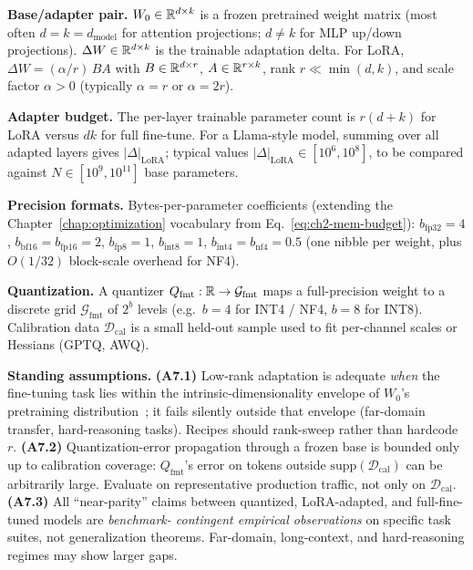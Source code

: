 \begin{notationbox}
\textbf{Base/adapter pair.}
$W_0 \in \mathbb{R}^{d \times k}$ is a frozen pretrained weight matrix (most
often $d = k = d_{\mathrm{model}}$ for attention projections; $d \ne
k$ for MLP up/down projections). $\Delta W \in \mathbb{R}^{d \times k}$ is
the trainable adaptation delta. For LoRA,
$\Delta W = (\alpha/r)\,B A$ with $B \in \mathbb{R}^{d \times r}$,
$A \in \mathbb{R}^{r \times k}$, rank $r \ll \min(d,k)$, and scale factor
$\alpha > 0$ (typically $\alpha = r$ or $\alpha = 2r$).

\textbf{Adapter budget.}
The per-layer trainable parameter count is $r(d+k)$ for LoRA versus
$dk$ for full fine-tune. For a Llama-style model, summing over all
adapted layers gives $|\Delta|_{\mathrm{LoRA}}$; typical values
$|\Delta|_{\mathrm{LoRA}} \in [10^{6}, 10^{8}]$, to be compared
against $N \in [10^{9}, 10^{11}]$ base parameters.

\textbf{Precision formats.}
Bytes-per-parameter coefficients (extending the Chapter~\ref{chap:optimization} vocabulary
from Eq.~\eqref{eq:ch2-mem-budget}): $b_{\mathrm{fp32}} = 4$,
$b_{\mathrm{bf16}} = b_{\mathrm{fp16}} = 2$, $b_{\mathrm{fp8}} = 1$,
$b_{\mathrm{int8}} = 1$, $b_{\mathrm{int4}} = b_{\mathrm{nf4}} = 0.5$
(one nibble per weight, plus $O(1/32)$ block-scale overhead for NF4).

\textbf{Quantization.}
A quantizer $Q_{\mathrm{fmt}} : \mathbb{R} \to \mathcal{G}_{\mathrm{fmt}}$
maps a full-precision weight to a discrete grid
$\mathcal{G}_{\mathrm{fmt}}$ of $2^{b}$ levels (e.g.\ $b=4$ for INT4
/ NF4, $b=8$ for INT8). Calibration data $\mathcal{D}_{\mathrm{cal}}$
is a small held-out sample used to fit per-channel scales or
Hessians (GPTQ, AWQ).

\textbf{Standing assumptions.}
\textbf{(A7.1)} Low-rank adaptation is adequate \emph{when} the
fine-tuning task lies within the intrinsic-dimensionality envelope
of $W_0$'s pretraining distribution~\citep{aghajanyan2021intrinsic};
it fails silently outside that envelope (far-domain transfer,
hard-reasoning tasks). Recipes should rank-sweep rather than hardcode
$r$.
\textbf{(A7.2)} Quantization-error propagation through a frozen base
is bounded only up to calibration coverage:
$Q_{\mathrm{fmt}}$'s error on tokens outside
$\mathrm{supp}(\mathcal{D}_{\mathrm{cal}})$ can be arbitrarily large.
Evaluate on representative production traffic, not only on
$\mathcal{D}_{\mathrm{cal}}$.
\textbf{(A7.3)} All ``near-parity'' claims between quantized,
LoRA-adapted, and full-fine-tuned models are \emph{benchmark-
contingent empirical observations} on specific task suites, not
generalization theorems. Far-domain, long-context, and hard-reasoning
regimes may show larger gaps.
\end{notationbox}

